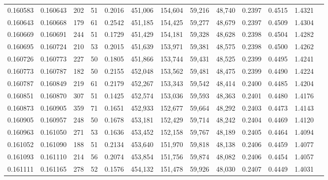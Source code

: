 \begin{tabular}{rrrrrrrrrrrrr}
0.160583 & 0.160643 &   202 &  51 &                                     0.2016 & 451,006 & 154,604 &  59,216 &  48,740 & 0.2397 & 0.4515 & 1.4321 \\
0.160643 & 0.160668 &   179 &  61 &                                     0.2542 & 451,185 & 154,425 &  59,277 &  48,679 & 0.2397 & 0.4509 & 1.4304 \\
0.160669 & 0.160691 &   244 &  51 &                                     0.1729 & 451,429 & 154,181 &  59,328 &  48,628 & 0.2398 & 0.4504 & 1.4282 \\
0.160695 & 0.160724 &   210 &  53 &                                     0.2015 & 451,639 & 153,971 &  59,381 &  48,575 & 0.2398 & 0.4500 & 1.4262 \\
0.160726 & 0.160773 &   227 &  50 &                                     0.1805 & 451,866 & 153,744 &  59,431 &  48,525 & 0.2399 & 0.4495 & 1.4241 \\
0.160773 & 0.160787 &   182 &  50 &                                     0.2155 & 452,048 & 153,562 &  59,481 &  48,475 & 0.2399 & 0.4490 & 1.4224 \\
0.160787 & 0.160849 &   219 &  61 &                                     0.2179 & 452,267 & 153,343 &  59,542 &  48,414 & 0.2400 & 0.4485 & 1.4204 \\
0.160851 & 0.160870 &   307 &  51 &                                     0.1425 & 452,574 & 153,036 &  59,593 &  48,363 & 0.2401 & 0.4480 & 1.4176 \\
0.160873 & 0.160905 &   359 &  71 &                                     0.1651 & 452,933 & 152,677 &  59,664 &  48,292 & 0.2403 & 0.4473 & 1.4143 \\
0.160905 & 0.160957 &   248 &  50 &                                     0.1678 & 453,181 & 152,429 &  59,714 &  48,242 & 0.2404 & 0.4469 & 1.4120 \\
0.160963 & 0.161050 &   271 &  53 &                                     0.1636 & 453,452 & 152,158 &  59,767 &  48,189 & 0.2405 & 0.4464 & 1.4094 \\
0.161052 & 0.161090 &   188 &  51 &                                     0.2134 & 453,640 & 151,970 &  59,818 &  48,138 & 0.2406 & 0.4459 & 1.4077 \\
0.161093 & 0.161110 &   214 &  56 &                                     0.2074 & 453,854 & 151,756 &  59,874 &  48,082 & 0.2406 & 0.4454 & 1.4057 \\
0.161111 & 0.161165 &   278 &  52 &                                     0.1576 & 454,132 & 151,478 &  59,926 &  48,030 & 0.2407 & 0.4449 & 1.4031 \\

\end{tabular}
